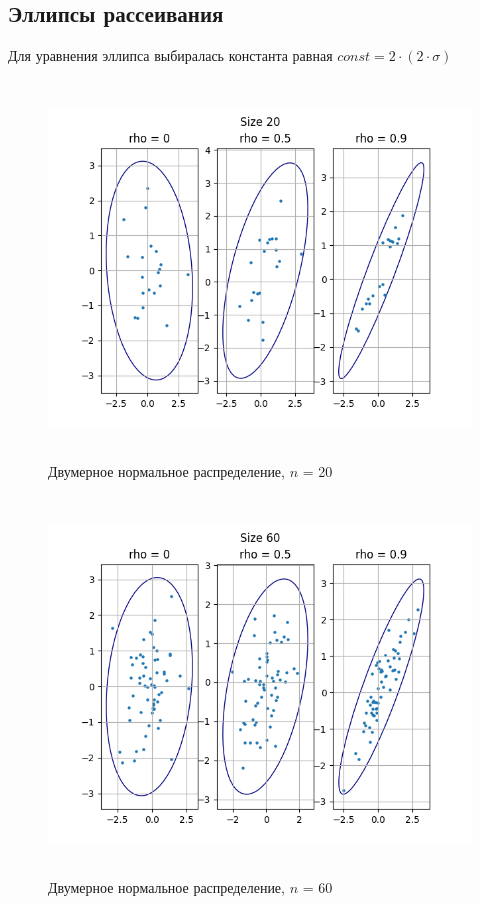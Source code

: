 \subsection{Эллипсы рассеивания}
\noindent Для уравнения эллипса выбиралась константа равная $const = 2 \cdot (2 \cdot \sigma)$

\begin{figure}[H]
	\centering
	\includegraphics[width = 16cm, height = 10cm]{res/size20_t1.png}
	\caption{Двумерное нормальное распределение, $n$ = 20}
	\label{fig:n20}
\end{figure}

\begin{figure}[H]
	\centering
	\includegraphics[width = 16cm, height = 10cm]{res/size60_t1.png}
	\caption{Двумерное нормальное распределение, $n$ = 60}
	\label{fig:n60}
\end{figure}


